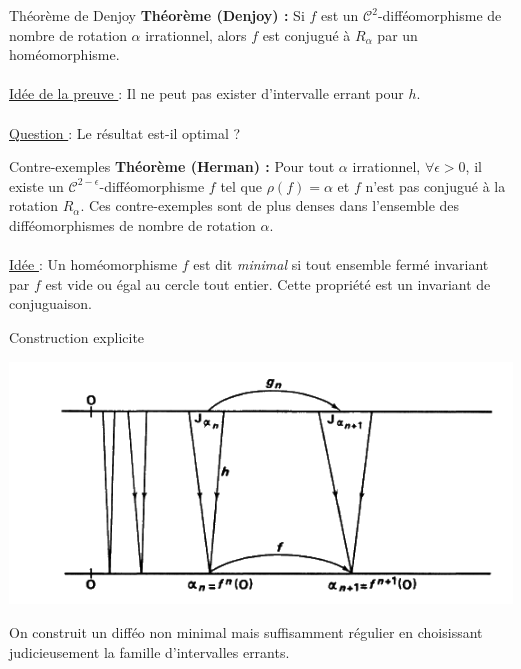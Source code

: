 \documentclass[10pt]{beamer}
\begin{document}
\begin{frame}{Théorème de Denjoy}
\textbf{Théorème (Denjoy) :} Si $f$ est un $\mathcal{C}^2$-difféomorphisme de nombre de rotation $\alpha$ irrationnel, alors $f$ est conjugué à $R_\alpha$ par un homéomorphisme. \\~\\

\underline{Idée de la preuve }: Il ne peut pas exister d'intervalle errant pour $h$. \\~\\

\underline{Question }: Le résultat est-il optimal ?

\end{frame}


\begin{frame}{Contre-exemples}
\textbf{Théorème (Herman) :} Pour tout $\alpha$ irrationnel, $\forall \epsilon > 0$, il existe un $\mathcal{C}^{2-\epsilon}$-difféomorphisme $f$ tel que $\rho(f)=\alpha$ et $f$ n'est pas conjugué à la rotation $R_\alpha$. Ces contre-exemples sont de plus denses dans l'ensemble des difféomorphismes de nombre de rotation $\alpha$. \\~\\

\underline{Idée }: Un homéomorphisme $f$ est dit \textit{minimal} si tout ensemble fermé invariant par  $f$ est vide ou égal au cercle tout entier. Cette propriété est un invariant de conjuguaison.
\end{frame}



\begin{frame}{Construction explicite}

\begin{centering}
\includegraphics[scale=0.35]{diagram.png}
\end{centering}

On construit un difféo non minimal mais suffisamment régulier en choisissant judicieusement la famille d'intervalles errants.
\end{frame}
\end{document}
